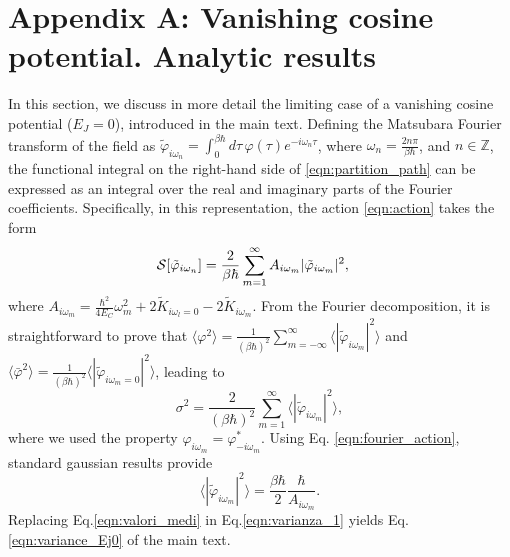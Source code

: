 \documentclass[aps,notitlepage,twocolumn,prl,nolongbibliography,superscriptaddress]{revtex4-2}
\begin{document}
\section{Appendix A: Vanishing cosine potential. Analytic results}
In this section, we discuss in more detail the limiting case of a vanishing cosine potential ($E_J = 0$), introduced in the main text. Defining the Matsubara Fourier transform of the field as $\tilde{\varphi}_{i\omega_n} = \int_0^{\beta\hbar} d\tau\, \varphi(\tau) e^{-i\omega_n\tau}$, where $\omega_n = \frac{2n\pi}{\beta\hbar}$, and $n \in \mathbb{Z}$, the functional integral on the right-hand side of \eqref{eqn:partition_path} can be expressed as an integral over the real and imaginary parts of the Fourier coefficients. Specifically, in this representation, the action \eqref{eqn:action} takes the form
\begin{equation}\begin{split}{\label{eqn:fourier_action}}
     &{\cal S}[{\tilde\varphi}_{i\omega_n}] = \frac{2}{\beta \hbar} \sum_{m=1}^{\infty}A_{i\omega_m}|{\tilde\varphi}_{i\omega_m}|^2,
\end{split}
\end{equation}
where $A_{i\omega_m} = \frac{\hbar^2}{4E_C}\omega_m^2+2{\tilde K}_{i\omega_l=0}-2{\tilde K}_{i\omega_m}$.
From the Fourier decomposition, it is straightforward to prove that $\langle \varphi^2\rangle = \frac{1}{(\beta \hbar)^2}\sum_{m=-\infty}^{\infty}\langle|\tilde{\varphi}_{i\omega_m}|^2\rangle$ and $\langle\bar \varphi ^2\rangle = \frac{1}{(\beta \hbar)^2} \langle |\tilde{\varphi}_{i\omega_m = 0}|^2\rangle$, leading to
\begin{equation}\label{eqn:varianza_1}
    \sigma^2 = \frac{2}{(\beta\hbar)^2} \sum_{m=1}^{\infty} \langle |\tilde{\varphi}_{i\omega_m}|^2 \rangle,
\end{equation}
where we used the property $\varphi_{i\omega_m} = \varphi^*_{-i\omega_m}$. Using Eq. \eqref{eqn:fourier_action}, standard gaussian results provide
\begin{equation}\label{eqn:valori_medi}
    \langle |\tilde{\varphi}_{i\omega_m}|^2 \rangle = \frac{\beta \hbar}{2} \frac{\hbar}{A_{i\omega_m}}.
\end{equation}
Replacing Eq.\eqref{eqn:valori_medi} in Eq.\eqref{eqn:varianza_1} yields Eq.\eqref{eqn:variance_Ej0} of the main text.
\end{document}
